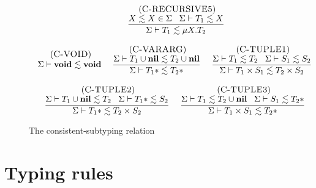 \begin{figure}[!ht]
\begin{footnotesize}
$$\begin{array}{c}
\begin{array}{c}
\end{array}
\;
\begin{array}{c}
\; (\textsc{C-RECURSIVE5})\\
\dfrac{X \lesssim X \in \Sigma \;\;\;
       \Sigma \vdash T_{1} \lesssim X}
      {\Sigma \vdash T_{1} \lesssim \mu X.T_{2}}
\end{array}
\\ \\
\begin{array}{c}
\; (\textsc{C-VOID})\\
\Sigma \vdash \mathbf{void} \lesssim \mathbf{void}
\end{array}
\;
\begin{array}{c}
\; (\textsc{C-VARARG})\\
\dfrac{\Sigma \vdash T_{1} \cup \mathbf{nil} \lesssim T_{2} \cup \mathbf{nil}}
      {\Sigma \vdash T_{1}* \lesssim T_{2}*}
\end{array}
\;
\begin{array}{c}
\; (\textsc{C-TUPLE1})\\
\dfrac{\Sigma \vdash T_{1} \lesssim T_{2} \;\;\;
       \Sigma \vdash S_{1} \lesssim S_{2}}
      {\Sigma \vdash T_{1} \times S_{1} \lesssim T_{2} \times S_{2}}
\end{array}
\\ \\
\begin{array}{c}
\; (\textsc{C-TUPLE2})\\
\dfrac{\Sigma \vdash T_{1} \cup \mathbf{nil} \lesssim T_{2} \;\;\;
       \Sigma \vdash T_{1}* \lesssim S_{2}}
      {\Sigma \vdash T_{1}* \lesssim T_{2} \times S_{2}}
\end{array}
\;
\begin{array}{c}
\; (\textsc{C-TUPLE3})\\
\dfrac{\Sigma \vdash T_{1} \lesssim T_{2} \cup \mathbf{nil} \;\;\;
       \Sigma \vdash S_{1} \lesssim T_{2}*}
      {\Sigma \vdash T_{1} \times S_{1} \lesssim T_{2}*}
\end{array}
\end{array}
$$
\end{footnotesize}
\dend
\caption{The consistent-subtyping relation}
\label{fig:consistent_subtyping}
\end{figure}

\section{Typing rules}

